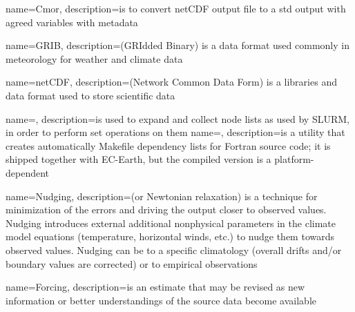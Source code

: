 % 
% 



{
  name=Cmor,
  description={is to convert netCDF output file to a std output with agreed variables with metadata%
    }
}

 
{
  name=GRIB,
  description={(GRIdded Binary) is a data format used commonly in meteorology for weather and climate data}
}

{
  name=netCDF,
  description={(Network Common Data Form) is a libraries and data format used to store scientific data}
}

{
  name=,
  description={is used to expand and collect node lists as used by \acrshort{SLURM}, in order to perform set operations on them}
}
{
  name=,
  description={is a utility that creates automatically Makefile dependency lists for Fortran source code; it is shipped together with EC-Earth, but the compiled version is a platform-dependent}
}


{
  name=Nudging,
  description={(or Newtonian relaxation) is a technique for minimization of the errors and driving the output closer to observed values.  
    Nudging introduces external additional nonphysical parameters in the climate model equations (temperature, horizontal winds, etc.) to nudge them towards observed values. 
    Nudging can be to a specific climatology (overall drifts and/or boundary values are corrected) or to empirical observations}
}

{
  name=Forcing,
  description={is an estimate that may be revised as new information or better understandings of the source data become available~\cite{force}}
}
 
 